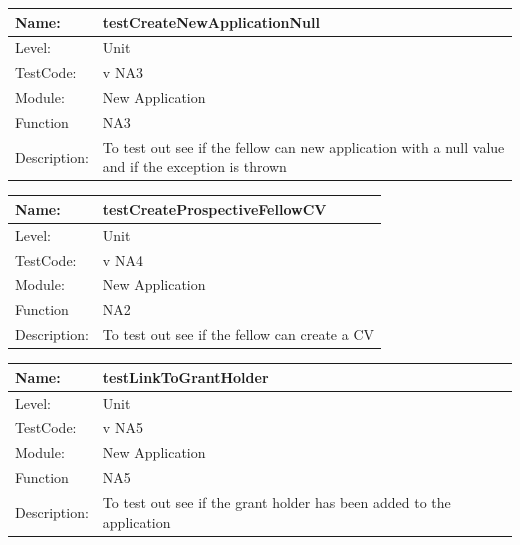 \documentclass[12pt]{article}
\begin{document}
\begin{flushleft}
\begin{center}
\begin{tabular}{|l|p{12cm}|}
\hline
 Name: & testCreateNewApplicationNull  \\
\hline
Level: & Unit \\
\hline
TestCode: & v NA3 \\
\hline
Module:& New Application\\
\hline
Function & NA3 \\
\hline
Description: & To test out see if the fellow can  new application with a null value and if the exception is thrown  \\
\hline

\end{tabular}
\end{center}

\begin{center}
\begin{tabular}{|l|p{12cm}|}
\hline

 Name: & testCreateProspectiveFellowCV  \\
\hline
Level: & Unit \\
\hline
TestCode: & v NA4 \\
\hline
Module:& New Application\\
\hline
Function & NA2 \\
\hline
Description: & To test out see if the fellow can  create a CV  \\
\hline

\end{tabular}
\end{center}

\begin{center}
\begin{tabular}{|l|p{12cm}|}
\hline

 Name: & testLinkToGrantHolder  \\
\hline
Level: & Unit \\
\hline
TestCode: & v NA5 \\
\hline
Module:& New Application\\
\hline
Function & NA5 \\
\hline
Description: & To test out see if the grant holder has been added to the application  \\
\hline

\end{tabular}
\end{center}


\end{flushleft}
\end{document}
